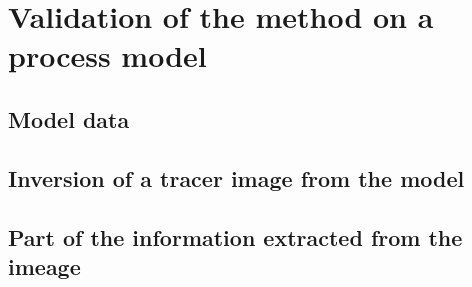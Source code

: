 \documentclass[compress,slidescentered,notes=show]{beamer}
\begin{document}
\begin{frame}
\end{frame}

\section[Process model data]{Validation of the method on a process model}


	\subsection{Model data}
\begin{frame}
\end{frame}

	\subsection{Inversion of a tracer image from the model}
\begin{frame}
\end{frame} 

	\subsection{Part of the information extracted from the imeage}
\begin{frame}
\end{frame} 
\end{document}
